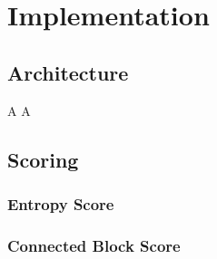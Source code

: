 \chapter{Implementation}
\label{chap:impl}

	\clearpage

	\section{Architecture}
	
		A\clearpage
		A\clearpage
	
	\section{Scoring}
	
		\subsection{Entropy Score}
		
			\clearpage
		
		\subsection{Connected Block Score}
		
			\clearpage
